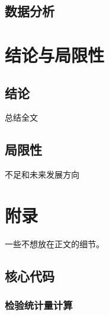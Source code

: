 \documentclass{SUFEThesis}
\begin{document}

\subsection{数据分析}


\section{结论与局限性}
\subsection{结论}
总结全文
\subsection{局限性}
不足和未来发展方向

\newpage
% 
% 
 
\section{附录}
一些不想放在正文的细节。
\subsection{核心代码}
\subsubsection{检验统计量计算}
% 

%  
\end{document}
